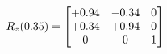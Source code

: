 \documentclass[preview]{standalone}
\begin{document}
\begin{align*}
\special{dvisvgm:raw <g id='unique000'>}R_{z}(0.35) = \begin{bmatrix}+0.94 & -0.34 & 0 \\+0.34 & +0.94 & 0 \\0 & 0 & 1\end{bmatrix}\special{dvisvgm:raw </g>}
\end{align*}
\end{document}

